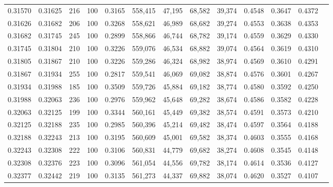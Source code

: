 \begin{tabular}{rrrrrrrrrrrrr}
0.31570 & 0.31625 &   216 & 100 &                                     0.3165 & 558,415 &  47,195 &  68,582 &  39,374 & 0.4548 & 0.3647 & 0.4372 \\
0.31626 & 0.31682 &   206 & 100 &                                     0.3268 & 558,621 &  46,989 &  68,682 &  39,274 & 0.4553 & 0.3638 & 0.4353 \\
0.31682 & 0.31745 &   245 & 100 &                                     0.2899 & 558,866 &  46,744 &  68,782 &  39,174 & 0.4559 & 0.3629 & 0.4330 \\
0.31745 & 0.31804 &   210 & 100 &                                     0.3226 & 559,076 &  46,534 &  68,882 &  39,074 & 0.4564 & 0.3619 & 0.4310 \\
0.31805 & 0.31867 &   210 & 100 &                                     0.3226 & 559,286 &  46,324 &  68,982 &  38,974 & 0.4569 & 0.3610 & 0.4291 \\
0.31867 & 0.31934 &   255 & 100 &                                     0.2817 & 559,541 &  46,069 &  69,082 &  38,874 & 0.4576 & 0.3601 & 0.4267 \\
0.31934 & 0.31988 &   185 & 100 &                                     0.3509 & 559,726 &  45,884 &  69,182 &  38,774 & 0.4580 & 0.3592 & 0.4250 \\
0.31988 & 0.32063 &   236 & 100 &                                     0.2976 & 559,962 &  45,648 &  69,282 &  38,674 & 0.4586 & 0.3582 & 0.4228 \\
0.32063 & 0.32125 &   199 & 100 &                                     0.3344 & 560,161 &  45,449 &  69,382 &  38,574 & 0.4591 & 0.3573 & 0.4210 \\
0.32125 & 0.32188 &   235 & 100 &                                     0.2985 & 560,396 &  45,214 &  69,482 &  38,474 & 0.4597 & 0.3564 & 0.4188 \\
0.32188 & 0.32243 &   213 & 100 &                                     0.3195 & 560,609 &  45,001 &  69,582 &  38,374 & 0.4603 & 0.3555 & 0.4168 \\
0.32243 & 0.32308 &   222 & 100 &                                     0.3106 & 560,831 &  44,779 &  69,682 &  38,274 & 0.4608 & 0.3545 & 0.4148 \\
0.32308 & 0.32376 &   223 & 100 &                                     0.3096 & 561,054 &  44,556 &  69,782 &  38,174 & 0.4614 & 0.3536 & 0.4127 \\
0.32377 & 0.32442 &   219 & 100 &                                     0.3135 & 561,273 &  44,337 &  69,882 &  38,074 & 0.4620 & 0.3527 & 0.4107 \\

\end{tabular}
